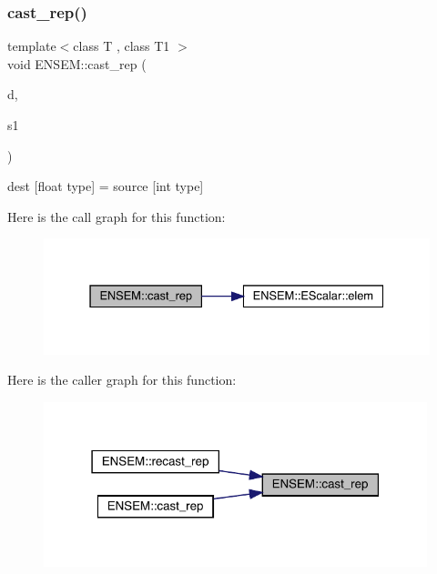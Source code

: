 \subsubsection{\texorpdfstring{cast\_rep()}{cast\_rep()}}
{\footnotesize\ttfamily template$<$class T , class T1 $>$ \\
void E\+N\+S\+E\+M\+::cast\+\_\+rep (\begin{DoxyParamCaption}\item[{T \&}]{d,  }\item[{const \mbox{\hyperlink{classENSEM_1_1EScalar}{E\+Scalar}}$<$ T1 $>$ \&}]{s1 }\end{DoxyParamCaption})\hspace{0.3cm}{\ttfamily [inline]}}



dest \mbox{[}float type\mbox{]} = source \mbox{[}int type\mbox{]} 

Here is the call graph for this function\+:\nopagebreak
\begin{figure}[H]
\begin{center}
\leavevmode
\includegraphics[width=331pt]{d4/dca/group__escalar_ga1fe36c2ff072b322fac723a4e44f6584_cgraph}
\end{center}
\end{figure}
Here is the caller graph for this function\+:\nopagebreak
\begin{figure}[H]
\begin{center}
\leavevmode
\includegraphics[width=316pt]{d4/dca/group__escalar_ga1fe36c2ff072b322fac723a4e44f6584_icgraph}
\end{center}
\end{figure}
\mbox{\label{group__escalar_gaccbb7d66b912e8f0972f4e50095f296e}} 

